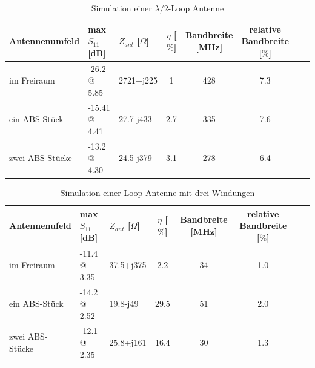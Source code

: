
\begin{table}[!h]
 \centering
 \begin{tabular}{p{3cm} p{3cm} l c c c c r} 
 \toprule 
 Antennenumfeld 	& max $S_{11}$ [dB]		& $Z_{ant}$ [$\Omega$] 	& $\eta$ [$\%$] & Bandbreite [MHz] & relative Bandbreite [$\%$]\\ 
 \midrule
im Freiraum 		&	-26.2 @ 5.85	& 	2721+j225	& 1		&	428 & 7.3\\ 					 		
ein ABS-Stück 	& -15.41 @ 4.41 	&	27.7-j433	& 2.7	&	335 & 7.6 \\
zwei ABS-Stücke & -13.2 @ 4.30 	&	24.5-j379	& 3.1	&	278 & 6.4\\
 \bottomrule
 \end{tabular}
 \caption{Simulation einer $\lambda/2$-Loop Antenne }
 \label{tab:Evaluation_Vergeich_Loop_Antennen_Lmabda05}
\end{table}

\begin{table}[!h]
 \centering
 \begin{tabular}{p{3cm} p{3cm} l c c c c r} 
 \toprule 
 Antennenufeld & max $S_{11}$ [dB]		& $Z_{ant}$ [$\Omega$] 	& $\eta$ [$\%$] & Bandbreite [MHz] & relative Bandbreite [$\%$]\\ 
 \midrule
im Freiraum 		&	-11.4 @ 3.35		& 	37.5+j375	& 	2.2		& 34		& 1.0\\ 					 		
ein ABS-Stück 	& -14.2 @ 2.52 		&	19.8-j49		&	29.5		& 51	 	& 2.0\\
zwei ABS-Stücke 	& -12.1 @ 2.35 		&	25.8+j161	&	16.4		& 30 	& 1.3\\
 \bottomrule
 \end{tabular}
 \caption{Simulation einer Loop Antenne mit drei Windungen }
 \label{tab:Evaluation_Vergeich_Loop_Antennen_Coil}
\end{table}


